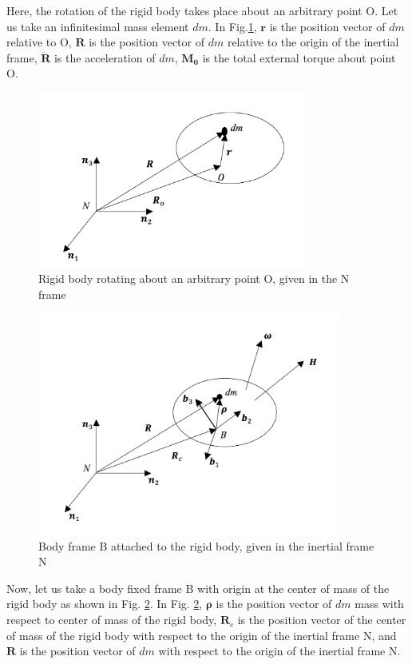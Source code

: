 Here, the rotation of the rigid body takes place about an arbitrary point O. 
Let us take an infinitesimal mass element $dm$. 
In Fig.\ref{fig:attDyn1}, $\bm{r}$ is the position vector of $dm$ relative to O, $\bm{R}$ is the position vector of $dm$ relative to the origin of the inertial frame, $\ddot{\bm{R}}$ is the acceleration of $dm$, $\bm{M_0}$ is the total external torque about point O.

\begin{figure}
\begin{center}
\includegraphics[width=9cm]{figures/attDyn1}    %
\caption{Rigid body rotating about an arbitrary point O, given in the N frame} 
\label{fig:attDyn1}
\end{center}
\end{figure}

\begin{figure}
\begin{center}
\includegraphics[width=10cm]{figures/attDyn2}    %
\caption{Body frame B attached to the rigid body, given in the inertial frame N} 
\label{fig:attDyn2}
\end{center}
\end{figure}

Now, let us take a body fixed frame B with origin at the center of mass of the rigid body as shown in Fig. \ref{fig:attDyn2}. 
In Fig. \ref{fig:attDyn2}, $\bm{\rho}$  is the position vector of $dm$ mass with respect to center of mass of the rigid body, $\bm{R}_c$ is the position vector of the center of mass of the rigid body with respect to the origin of the inertial frame N, and $\bm{R}$ is the position vector of $dm$ with respect to the origin of the inertial frame N. 

